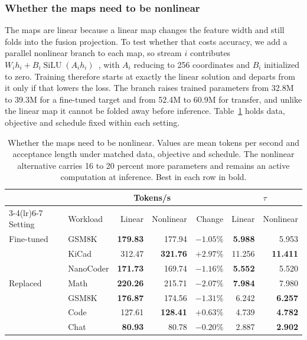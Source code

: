 \subsubsection{Whether the maps need to be nonlinear}
\label{sec:ablation-capacity}
The maps are linear because a linear map changes the feature width and still folds into the fusion projection. To test whether that costs accuracy, we add a parallel nonlinear branch to each map, so stream $i$ contributes $W_ih_i+B_i\operatorname{SiLU}(A_ih_i)$~\citep{elfwing2018silu}, with $A_i$ reducing to 256 coordinates and $B_i$ initialized to zero. Training therefore starts at exactly the linear solution and departs from it only if that lowers the loss. The branch raises trained parameters from 32.8M to 39.3M for a fine-tuned target and from 52.4M to 60.9M for transfer, and unlike the linear map it cannot be folded away before inference. Table~\ref{tab:ablation-capacity} holds data, objective and schedule fixed within each setting.

\begin{table}[t]
\centering
\caption{Whether the maps need to be nonlinear. Values are mean tokens per second and acceptance length under matched data, objective and schedule. The nonlinear alternative carries 16 to 20 percent more parameters and remains an active computation at inference. Best in each row in bold.}
\label{tab:ablation-capacity}
\small
\begin{tabular}{llrrrrr}
\toprule
& & \multicolumn{2}{c}{Tokens/s} & & \multicolumn{2}{c}{$\tau$} \\
\cmidrule(lr){3-4}\cmidrule(lr){6-7}
Setting & Workload & Linear & Nonlinear & Change & Linear & Nonlinear \\
\midrule
Fine-tuned & GSM8K & \textbf{179.83} & 177.94 & $-1.05\%$ & \textbf{5.988} & 5.953 \\
 & KiCad & 312.47 & \textbf{321.76} & $+2.97\%$ & 11.256 & \textbf{11.411} \\
 & NanoCoder & \textbf{171.73} & 169.74 & $-1.16\%$ & \textbf{5.552} & 5.520 \\
\midrule
Replaced & Math & \textbf{220.26} & 215.71 & $-2.07\%$ & \textbf{7.984} & 7.980 \\
 & GSM8K & \textbf{176.87} & 174.56 & $-1.31\%$ & 6.242 & \textbf{6.257} \\
 & Code & 127.61 & \textbf{128.41} & $+0.63\%$ & 4.739 & \textbf{4.782} \\
 & Chat & \textbf{80.93} & 80.78 & $-0.20\%$ & 2.887 & \textbf{2.902} \\
\bottomrule
\end{tabular}
\end{table}


